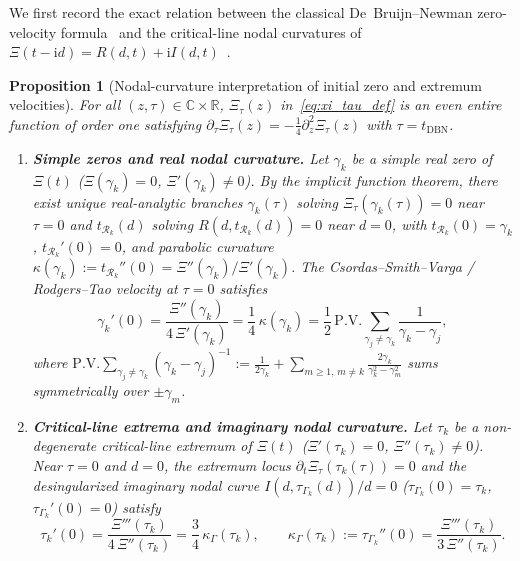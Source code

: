 \documentclass[11pt,reqno]{amsart}
\theoremstyle{plain}
\newtheorem{proposition}[theorem]{Proposition}
\theoremstyle{definition}
\theoremstyle{remark}
\numberwithin{equation}{section}
\newcommand{\ii}{\mathrm{i}}
\newcommand{\PV}{\mathrm{P.V.}}
\begin{document}
We first record the exact relation between the classical De~Bruijn--Newman zero-velocity formula~\cite{csordas1994,rodgerstao2020,polymath2019} and the critical-line nodal curvatures of $\Xi(t - \ii d) = R(d,t) + \ii I(d,t)$~\cite{speiser1934,ariasdereyna2003}.

\begin{proposition}[Nodal-curvature interpretation of initial zero and extremum velocities]\label{prop:nodal_velocity}
For all $(z,\tau) \in \mathbb{C} \times \mathbb{R}$, $\Xi_\tau(z)$ in~\eqref{eq:xi_tau_def} is an even entire function of order one satisfying $\partial_\tau\Xi_\tau(z) = -\frac{1}{4}\partial_z^2\Xi_\tau(z)$ with $\tau = t_{\mathrm{DBN}}$.
\begin{enumerate}[label=\textup{(\roman*)},leftmargin=2.2em]
\item \textbf{Simple zeros and real nodal curvature.} Let $\gamma_k$ be a simple real zero of $\Xi(t)$ ($\Xi(\gamma_k) = 0$, $\Xi'(\gamma_k) \neq 0$). By the implicit function theorem, there exist unique real-analytic branches $\gamma_k(\tau)$ solving $\Xi_\tau(\gamma_k(\tau)) = 0$ near $\tau = 0$ and $t_{\mathcal{R}_k}(d)$ solving $R(d, t_{\mathcal{R}_k}(d)) = 0$ near $d = 0$, with $t_{\mathcal{R}_k}(0) = \gamma_k$, $t_{\mathcal{R}_k}'(0) = 0$, and parabolic curvature $\kappa(\gamma_k) := t_{\mathcal{R}_k}''(0) = \Xi''(\gamma_k)/\Xi'(\gamma_k)$. The Csordas--Smith--Varga / Rodgers--Tao velocity at $\tau = 0$ satisfies
\begin{equation}\label{eq:zero_velocity_curvature}
\gamma_k'(0) = \frac{\Xi''(\gamma_k)}{4\,\Xi'(\gamma_k)} = \frac{1}{4}\,\kappa(\gamma_k) = \frac{1}{2}\,\PV\sum_{\gamma_j \neq \gamma_k} \frac{1}{\gamma_k - \gamma_j},
\end{equation}
where $\PV\sum_{\gamma_j \neq \gamma_k}(\gamma_k - \gamma_j)^{-1} := \frac{1}{2\gamma_k} + \sum_{m \ge 1,\, m \neq k} \frac{2\gamma_k}{\gamma_k^2 - \gamma_m^2}$ sums symmetrically over $\pm\gamma_m$.
\item \textbf{Critical-line extrema and imaginary nodal curvature.} Let $\tau_k$ be a non-degenerate critical-line extremum of $\Xi(t)$ ($\Xi'(\tau_k) = 0$, $\Xi''(\tau_k) \neq 0$). Near $\tau = 0$ and $d = 0$, the extremum locus $\partial_t\Xi_\tau(\tau_k(\tau)) = 0$ and the desingularized imaginary nodal curve $I(d, \tau_{\Gamma_k}(d))/d = 0$ ($\tau_{\Gamma_k}(0) = \tau_k$, $\tau_{\Gamma_k}'(0) = 0$) satisfy
\begin{equation}\label{eq:extremum_velocity_curvature}
\tau_k'(0) = \frac{\Xi'''(\tau_k)}{4\,\Xi''(\tau_k)} = \frac{3}{4}\,\kappa_\Gamma(\tau_k), \qquad \kappa_\Gamma(\tau_k) := \tau_{\Gamma_k}''(0) = \frac{\Xi'''(\tau_k)}{3\,\Xi''(\tau_k)}.
\end{equation}
\end{enumerate}
\end{proposition}
\end{document}
